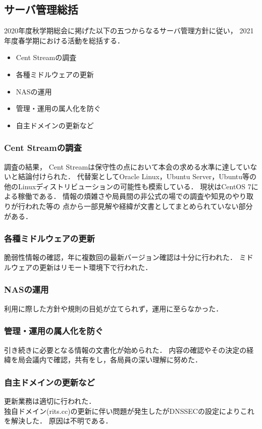 \subsection*{サーバ管理総括}


2020年度秋学期総会に掲げた以下の五つからなるサーバ管理方針に従い，
2021年度春学期における活動を総括する．
\begin{itemize}
    \item Cent Streamの調査
    \item 各種ミドルウェアの更新
    \item NASの運用
    \item 管理・運用の属人化を防ぐ
    \item 自主ドメインの更新など
\end{itemize}

\subsubsection*{Cent Streamの調査}
調査の結果，
Cent Streamは保守性の点において本会の求める水準に達していないと結論付けられた．
代替案としてOracle Linux，Ubuntu Server，Ubuntu等の
他のLinuxディストリビューションの可能性も模索している．
現状はCentOS 7による稼働である．
情報の煩雑さや局員間の非公式の場での調査や知見のやり取りが行われた等の
点から一部見解や経緯が文書としてまとめられていない部分がある．

\subsubsection*{各種ミドルウェアの更新}
脆弱性情報の確認，年に複数回の最新バージョン確認は十分に行われた．
ミドルウェアの更新はリモート環境下で行われた．

\subsubsection*{NASの運用}
利用に際した方針や規則の目処が立てられず，運用に至らなかった．

\subsubsection*{管理・運用の属人化を防ぐ}
引き続きに必要となる情報の文書化が始められた．
内容の確認やその決定の経緯を局会議内で確認，共有をし，各局員の深い理解に努めた．

\subsubsection*{自主ドメインの更新など}
更新業務は適切に行われた．\\
独自ドメイン(rits.cc)の更新に伴い問題が発生したがDNSSECの設定によりこれを解決した．
原因は不明である．

